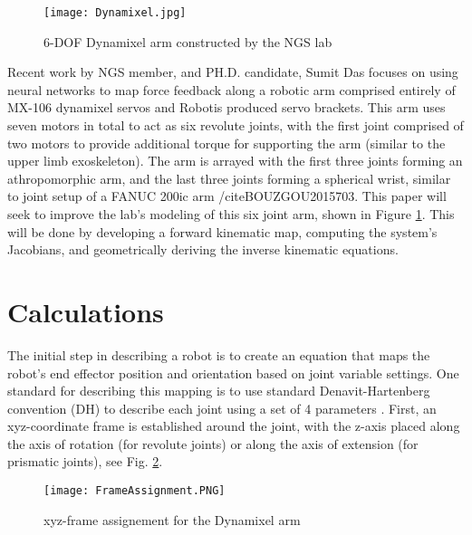 \documentclass[10pt,journal]{IEEEtran}
\begin{document}
\begin{figure}[ht!]
\centering
\texttt{[image: Dynamixel.jpg]}
\caption{6-DOF Dynamixel arm constructed by the NGS lab} 
\label{fig:DynamixelPhoto}
\end{figure}

\par Recent work by NGS member, and PH.D. candidate, Sumit Das focuses on using neural networks to map force feedback along a robotic arm comprised entirely of MX-106 dynamixel servos and Robotis produced servo brackets. This arm uses seven motors in total to act as six revolute joints, with the first joint comprised of two motors to provide additional torque for supporting the arm (similar to the upper limb exoskeleton). The arm is arrayed with the first three joints forming an athropomorphic arm, and the last three joints forming a spherical wrist, similar to joint setup of a FANUC 200ic arm /cite{BOUZGOU2015703}. This paper will seek to improve the lab's modeling of this six joint arm, shown in Figure \ref{fig:DynamixelPhoto}. This will be done by developing a forward kinematic map, computing the system's Jacobians, and geometrically deriving the inverse kinematic equations. 

\section{Calculations} %
The initial step in describing a robot is to create an equation that maps the robot's end effector position and orientation based on joint variable settings. One standard for describing this mapping is to use standard Denavit-Hartenberg convention (DH) to describe each joint using a set of 4 parameters \cite{spong2006robot}. First, an xyz-coordinate frame is established around the joint, with the z-axis placed along the axis of rotation (for revolute joints) or along the axis of extension (for prismatic joints), see Fig. \ref{fig:frameAssignment}. 

\begin{figure}[ht!]
\texttt{[image: FrameAssignment.PNG]}
\caption{xyz-frame assignement for the Dynamixel arm}
\label{fig:frameAssignment}
\end{figure}
\end{document}
